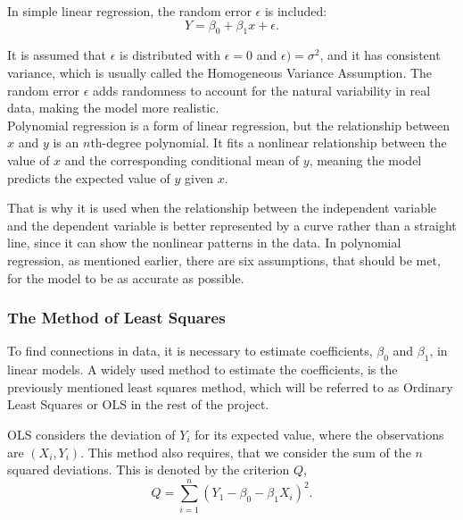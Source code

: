 \noindent In simple linear regression, the random error \( \epsilon \) is included:
\begin{equation}
Y = \beta_0 + \beta_1 x + \epsilon .
\end{equation}


\noindent It is assumed that \( \epsilon \) is distributed with $\epsilon = 0$ and $\epsilon) = \sigma^2$, and it has consistent variance, which is usually called the Homogeneous Variance Assumption. The random error \( \epsilon \) adds randomness to account for the natural variability in real data, making the model more realistic.
\newline\\
Polynomial regression is a form of linear regression, but the relationship between \( x \) and \( y \) is an \( n \)th-degree polynomial. It fits a nonlinear relationship between the value of \( x \) and the corresponding conditional mean of \( y \), meaning the model predicts the expected value of \( y \) given \( x \). \newline

\noindent That is why it is used when the relationship between the independent variable and the dependent variable is better represented by a curve rather than a straight line, since it can show the nonlinear patterns in the data.
In polynomial regression, as mentioned earlier, there are six assumptions, that should be met, for the model to be as accurate as possible.


\subsubsection{The Method of Least Squares}

\noindent To find connections in data, it is necessary to estimate coefficients, $\beta_0$ and $\beta_1$, in linear models. 
A widely used method to estimate the coefficients, is the previously mentioned least squares method, which will be referred to as Ordinary Least Squares or OLS in the rest of the project. \newline

\noindent OLS considers the deviation of $Y_i$ for  its expected value, where the observations are $(X_i, Y_i)$. 
This method also requires, that we consider the sum of the $n$ squared deviations.
This is denoted by the criterion $Q$,
\begin{equation}
Q=\sum_{i=1}^{n}(Y_1-\beta_0 - \beta_1 X_i)^2 .
\end{equation}

